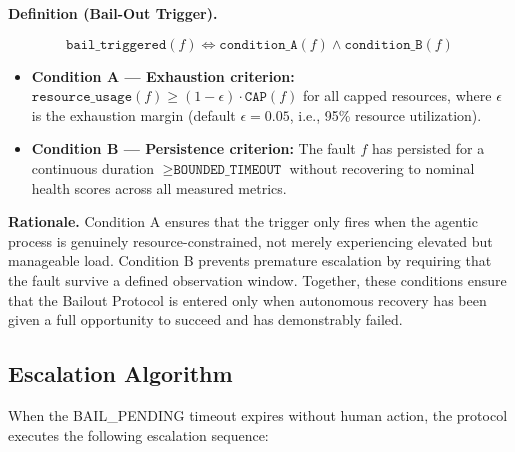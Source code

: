 \bigskip

\noindent\textbf{Definition (Bail-Out Trigger).}

\begin{equation}
  \texttt{bail\_triggered}(f) \iff \texttt{condition\_A}(f) \land \texttt{condition\_B}(f)
\end{equation}

\begin{itemize}
  \item \textbf{Condition A — Exhaustion criterion:} $\texttt{resource\_usage}(f) \geq (1 - \epsilon) \cdot \texttt{CAP}(f)$ for all capped resources, where $\epsilon$ is the exhaustion margin (default $\epsilon = 0.05$, i.e., 95\% resource utilization).
  \item \textbf{Condition B — Persistence criterion:} The fault $f$ has persisted for a continuous duration $\geq \texttt{BOUNDED\_TIMEOUT}$ without recovering to nominal health scores across all measured metrics.
\end{itemize}

\bigskip

\noindent\textbf{Rationale.} Condition A ensures that the trigger only fires when the agentic process is genuinely resource-constrained, not merely experiencing elevated but manageable load. Condition B prevents premature escalation by requiring that the fault survive a defined observation window. Together, these conditions ensure that the Bailout Protocol is entered only when autonomous recovery has been given a full opportunity to succeed and has demonstrably failed.

\subsection{Escalation Algorithm}

When the BAIL\_PENDING timeout expires without human action, the protocol executes the following escalation sequence:

\bigskip

